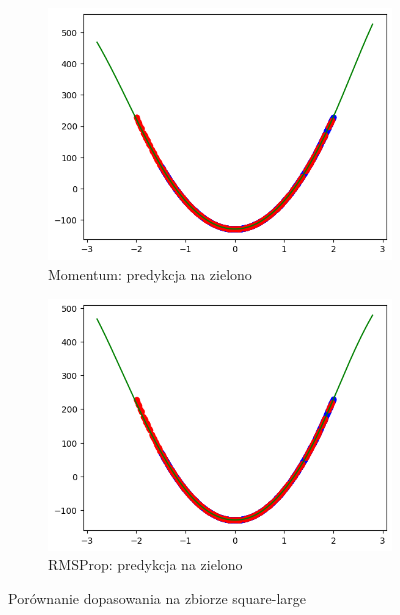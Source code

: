 \documentclass{article}
\begin{document}
\begin{figure}[H]
    \centering
    \begin{subfigure}[b]{0.48\textwidth}
        \centering
        \includegraphics[width=\textwidth]{img/nn3/square-large_momentum_fit.png}
        \caption{Momentum: predykcja na zielono}
    \end{subfigure}
    \hfill
    \begin{subfigure}[b]{0.48\textwidth}
        \centering
        \includegraphics[width=\textwidth]{img/nn3/square-large_rms_fit.png}
        \caption{RMSProp: predykcja na zielono}
    \end{subfigure}
    \caption{Porównanie dopasowania na zbiorze square-large}
\end{figure}
\end{document}
